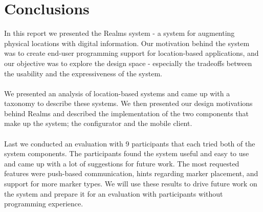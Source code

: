 \section{Conclusions}
\label{sec.conclusions}
In this report we presented the Realms system - a system for augmenting physical locations with digital information. Our motivation behind the system was to create end-user programming support for location-based applications, and our objective was to explore the design space - especially the tradeoffs between the usability and the expressiveness of the system. 
\\\\
We presented an analysis of location-based systems and came up with a taxonomy to describe these systems. We then presented our design motivations behind Realms and described the implementation of the two components that make up the system; the configurator and the mobile client.
\\\\
Last we conducted an evaluation with 9 participants that each tried both of the system components. The participants found the system useful and easy to use and came up with a lot of suggestions for future work. The most requested features were push-based communication, hints regarding marker placement, and support for more marker types. We will use these results to drive future work on the system and prepare it for an evaluation with participants without programming experience. 